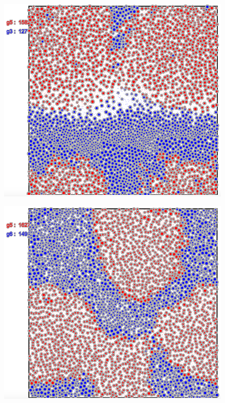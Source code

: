 \begin{figure}[h]
\center
\includegraphics[scale=0.3]{tourn2.png}
\caption{}
\label{fig:tourn2}
\end{figure}

\begin{figure}[h]
\center
\includegraphics[scale=0.3]{tourn3.png}
\caption{}
\label{fig:tourn3}
\end{figure}

